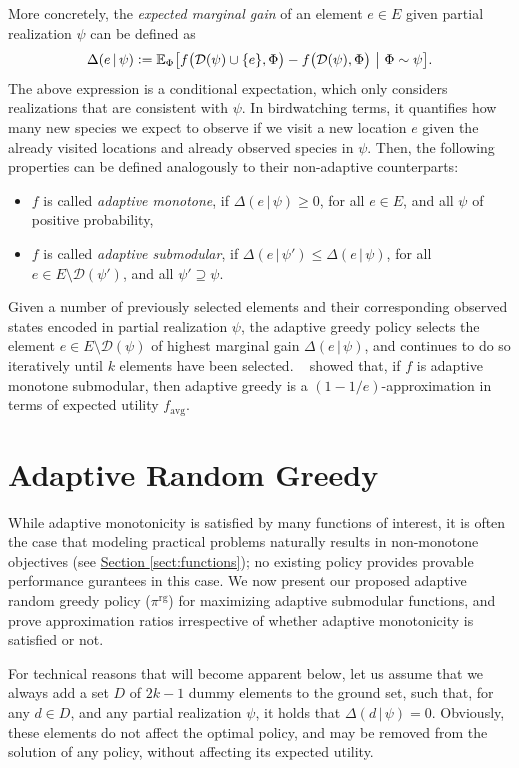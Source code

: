 \documentclass{article}
\newcommand{\sectref}[1]{\hyperref[#1]{Section \ref*{#1}}}
\newcommand{\defeq}{\vcentcolon=}
\newcommand{\mmid}{\,\vert\,}
\newcommand{\D}[2]{\Delta(#1\mmid#2)}
\newcommand{\pig}{\pi^{\textrm{rg}}}
\newcommand{\favg}{f_{\mathrm{avg}}}
\newcommand{\dom}{\mathcal{D}}
\newcommand{\citet}[1]{\citeauthor{#1}~\shortcite{#1}}
\begin{document}
More concretely, the \emph{expected marginal gain} of an element $e \in E$ given partial realization $\psi$ can be defined as
\begin{align*}
  \D{e}{\psi} \defeq \E[\Phi]{f\big(\mathcal{D}(\psi) \cup \{e\}, \Phi\big) - f\big(\dom(\psi), \Phi\big)}[\Phi \sim \psi].
\end{align*}
The above expression is a conditional expectation, which only considers realizations that are consistent with $\psi$.
In birdwatching terms, it quantifies how many new species we expect to observe if we visit a new location $e$ given the already visited locations and already observed species in $\psi$.
Then, the following properties can be defined analogously to their non-adaptive counterparts:
\begin{itemize}
\item $f$ is called \emph{adaptive monotone}, if $\D{e}{\psi} \geq 0$, for all $e \in E$, and all $\psi$ of positive probability,
\item $f$ is called \emph{adaptive submodular}, if $\D{e}{\psi'} \leq \D{e}{\psi}$, for all $e \in E \setminus \dom(\psi')$, and all $\psi' \supseteq \psi$.
\end{itemize}

Given a number of previously selected elements and their corresponding observed states encoded in partial realization $\psi$, the adaptive greedy policy selects the element $e \in E \setminus \dom(\psi)$ of highest marginal gain $\D{e}{\psi}$, and continues to do so iteratively until $k$ elements have been selected.
\citet{golovin11} showed that, if $f$ is adaptive monotone submodular, then adaptive greedy is a $(1-1/e)$-approximation in terms of expected utility $\favg$.

\section{Adaptive Random Greedy}
While adaptive monotonicity is satisfied by many functions of interest, it is often the case that modeling practical problems naturally results in non-monotone objectives (see \sectref{sect:functions}); no existing policy provides provable performance gurantees in this case.
We now present our proposed adaptive random greedy policy ($\pig$) for maximizing adaptive submodular functions, and prove approximation ratios irrespective of whether adaptive monotonicity is satisfied or not.

For technical reasons that will become apparent below, let us assume that we always add a set $D$ of $2k - 1$ dummy elements to the ground set, such that, for any $d \in D$, and any partial realization $\psi$, it holds that $\D{d}{\psi} = 0$.
Obviously, these elements do not affect the optimal policy, and may be removed from the solution of any policy, without affecting its expected utility.
\end{document}
